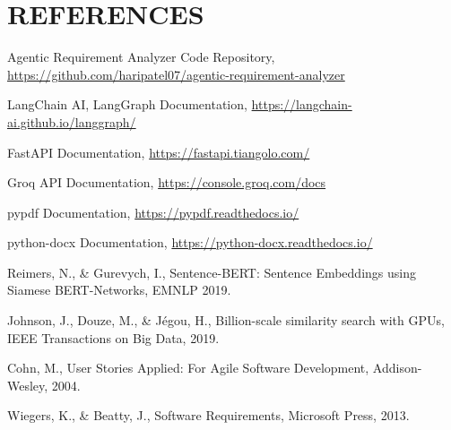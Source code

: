 \documentclass[12pt,a4paper,openany]{report}
\begin{document}
\chapter*{REFERENCES}
\begin{enumerate}[leftmargin=*,label={[\arabic*]}]
\item Agentic Requirement Analyzer Code Repository,\\ \url{https://github.com/haripatel07/agentic-requirement-analyzer}
\item LangChain AI, LangGraph Documentation, \url{https://langchain-ai.github.io/langgraph/}
\item FastAPI Documentation, \url{https://fastapi.tiangolo.com/}
\item Groq API Documentation, \url{https://console.groq.com/docs}
\item pypdf Documentation, \url{https://pypdf.readthedocs.io/}
\item python-docx Documentation, \url{https://python-docx.readthedocs.io/}
\item Reimers, N., \& Gurevych, I., Sentence-BERT: Sentence Embeddings using Siamese BERT-Networks, EMNLP 2019.
\item Johnson, J., Douze, M., \& J\'egou, H., Billion-scale similarity search with GPUs, IEEE Transactions on Big Data, 2019.
\item Cohn, M., User Stories Applied: For Agile Software Development, Addison-Wesley, 2004.
\item Wiegers, K., \& Beatty, J., Software Requirements, Microsoft Press, 2013.
\end{enumerate}
\end{document}

